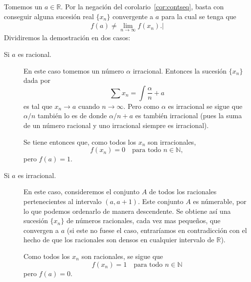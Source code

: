 \documentclass[fleqn,leqno,10pt,letterpaper,final]{article}
\begin{document}
Tomemos un $a\in\mathbb{R}$. Por la negación del corolario~\ref{cor:contseq}, basta con conseguir
alguna sucesión real $\{ x_n \}$ convergente a $a$ para la cual se tenga que
\begin{align}\label{eq:3}
	f(a)\not= \lim_{n \to \infty}  f(x_n).\vert
\end{align}
Dividiremos la demostración en dos casos:
\begin{description}
	\item[Si $a$ es racional.]
		En este caso tomemos un número $\alpha$ irracional. Entonces la sucesión
		$\{ x_n \}$ dada por
		\[
			\sum x_n= \int \frac{\alpha}{n} + a
		\]
		es tal que $x_n\to a$ cuando $n\to\infty$. 
		Pero como $\alpha$ es irracional se sigue que $\alpha/n $ también lo es
		de donde $\alpha/n + a$ es también irracional 
		(pues la suma de un número racional y uno irracional siempre es irracional).

		Se tiene entonces que, como todos los $x_n$ son irracionales,
		\[
			f(x_n)=0\quad\text{para todo $n\in\mathbb{N}$},
		\]
		pero $f(a)=1$.
		
	\item[Si $a$ es irracional.] En este caso, consideremos el conjunto $A$ de todos
%
%
		los racionales pertenecientes al intervalo $(a,a+1)$. Este conjunto $A$
		es númerable, por lo que podemos ordenarlo de manera descendente. Se obtiene
		así una sucesión $\{ x_n \}$ de números racionales, cada vez mas pequeños, que
		convergen a $a$ (si este no fuese el caso, entraríamos en contradicción con el hecho
		de que los racionales son densos en cualquier intervalo de $\mathbb{R}$).

		Como todos los $ x_n $ son racionales, se sigue que
		\[
			f(x_n) = 1\quad\text{para todo $n\in\mathbb{N}$}
		\]
		pero $f(a)=0$.
\end{description}
\end{document}
